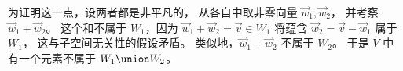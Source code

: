\begin{exercises}
\begin{answer}
      为证明这一点，设两者都是非平凡的，
      从各自中取非零向量 \( \vec{w}_1, \vec{w}_2 \)，
      并考察 \( \vec{w}_1+\vec{w}_2 \)。
      这个和不属于 \( W_1 \)，因为
      \( \vec{w}_1+\vec{w}_2=\vec{v}\in W_1 \) 将蕴含
      \( \vec{w}_2=\vec{v}-\vec{w}_1 \) 属于 \( W_1 \)，
      这与子空间无关性的假设矛盾。
      类似地，\( \vec{w}_1+\vec{w}_2 \) 不属于 \( W_2 \)。
      于是 \( V \) 中有一个元素不属于 \( W_1\union W_2 \)。
     \end{answer}

\end{exercises}
